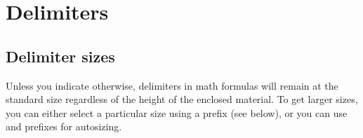 
\section{Delimiters}\label{delim}

\subsection{Delimiter sizes}\label{bigdel}

Unless you indicate otherwise, delimiters in math formulas will remain
at the standard size regardless of the height of the enclosed material.
To get larger sizes, you can either select a particular size using a
 prefix (see below), or you can use  and 
prefixes for autosizing.

